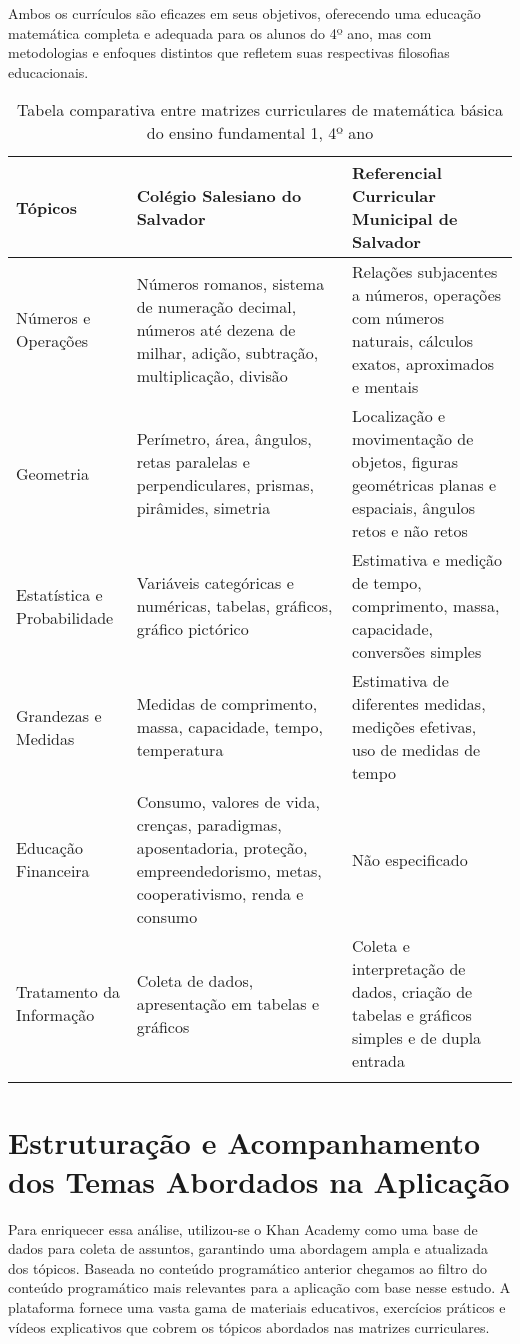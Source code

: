 Ambos os currículos são eficazes em seus objetivos, oferecendo uma educação matemática completa e adequada para os alunos do 4º ano, mas com metodologias e enfoques distintos que refletem suas respectivas filosofias educacionais.

\begin{longtable}{|>{\raggedright}p{3cm}|>{\raggedright}p{6cm}|>{\raggedright}p{6cm}|}
\hline
\textbf{Tópicos} & \textbf{Colégio Salesiano do Salvador} & \textbf{Referencial Curricular Municipal de Salvador} \\
\hline
Números e Operações & Números romanos, sistema de numeração decimal, números até dezena de milhar, adição, subtração, multiplicação, divisão & Relações subjacentes a números, operações com números naturais, cálculos exatos, aproximados e mentais \\
\hline
Geometria & Perímetro, área, ângulos, retas paralelas e perpendiculares, prismas, pirâmides, simetria & Localização e movimentação de objetos, figuras geométricas planas e espaciais, ângulos retos e não retos \\
\hline
Estatística e Probabilidade & Variáveis categóricas e numéricas, tabelas, gráficos, gráfico pictórico & Estimativa e medição de tempo, comprimento, massa, capacidade, conversões simples \\
\hline
Grandezas e Medidas & Medidas de comprimento, massa, capacidade, tempo, temperatura & Estimativa de diferentes medidas, medições efetivas, uso de medidas de tempo \\
\hline
Educação Financeira & Consumo, valores de vida, crenças, paradigmas, aposentadoria, proteção, empreendedorismo, metas, cooperativismo, renda e consumo & Não especificado \\
\hline
Tratamento da Informação & Coleta de dados, apresentação em tabelas e gráficos & Coleta e interpretação de dados, criação de tabelas e gráficos simples e de dupla entrada \\
\hline

\caption{Tabela comparativa entre matrizes curriculares de matemática básica do ensino fundamental 1, 4º ano}
\end{longtable}

\section{Estruturação e Acompanhamento dos Temas Abordados na Aplicação}


Para enriquecer essa análise, utilizou-se o Khan Academy como uma base de dados para coleta de assuntos, garantindo uma abordagem ampla e atualizada dos tópicos. Baseada no conteúdo programático anterior chegamos ao filtro do conteúdo programático mais relevantes para a aplicação com base nesse estudo. A plataforma fornece uma vasta gama de materiais educativos, exercícios práticos e vídeos explicativos que cobrem os tópicos abordados nas matrizes curriculares. \cite{khanacademy_numeros_soma_subtracao}

